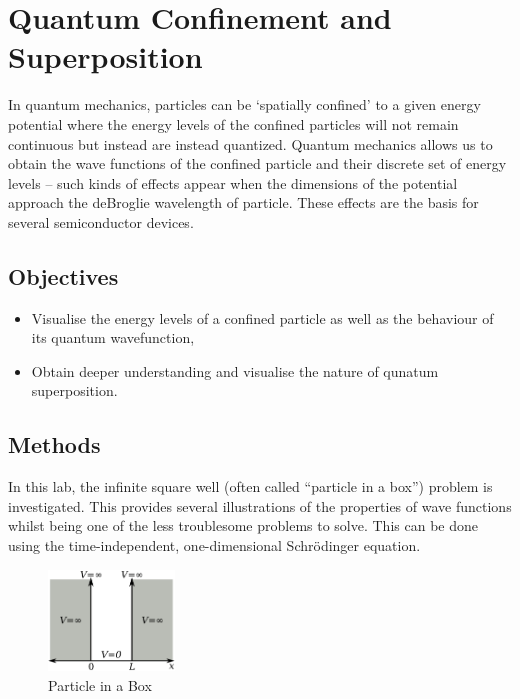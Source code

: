 \renewcommand{\chaptername}{Feb 8th: Lab}
\chapter{Quantum Confinement and Superposition}
In quantum mechanics, particles can be `spatially confined' to a given energy potential where the energy levels of the confined particles will not remain continuous but instead are instead quantized.
Quantum mechanics allows us to obtain the wave functions of the confined particle and their discrete set of energy levels -- such kinds of effects appear when the dimensions of the potential approach the deBroglie wavelength of particle. These effects are the basis for several semiconductor devices.

\section{Objectives}
\begin{itemize}
    \item Visualise the energy levels of a confined particle as well as the behaviour of its quantum wavefunction,
    \item Obtain deeper understanding and visualise the nature of qunatum superposition.
\end{itemize}

\section{Methods}
In this lab, the infinite square well (often called ``particle in a box'') problem is investigated. This provides several illustrations of the properties of wave functions whilst being one of the less troublesome problems to solve. This can be done using the time-independent, one-dimensional Schrödinger equation.

\begin{figure}[h]
    \centering
    \includegraphics[width=0.3\textwidth]{lab1/images/pIAB.png}
    \caption{Particle in a Box}
    \label{fig:particleInABox}
\end{figure}

